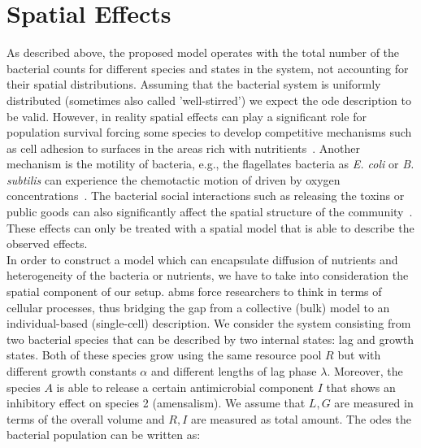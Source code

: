 \documentclass[10pt,A4paper]{article}
\numberwithin{equation}{section}
\begin{document}
\section{Spatial Effects}
As described above, the proposed model operates with the total number of the bacterial counts for
different species and states in the system, not accounting for their spatial distributions.
Assuming that the bacterial system is uniformly distributed (sometimes also called 'well-stirred')
we expect the \ac{ode} description to be valid.
However, in reality spatial effects can play a significant role for population survival forcing some
species to develop competitive mechanisms such as cell adhesion to surfaces in the areas rich with
nutritients~\cite{htuson_bacteriasurface_2013}.
Another mechanism is the motility of bacteria, e.g., the flagellates bacteria as \textit{E. coli} or
\textit{B. subtilis} can experience the chemotactic motion of driven by oxygen
concentrations~\cite{decoene_microscopic_2011}.
The bacterial social interactions such as releasing the toxins or public goods can also
significantly affect the spatial structure of the community~\cite{blanchard_bacterial_2015}.
These effects can only be treated with a spatial model that is able to describe the observed
effects.\\
In order to construct a model which can encapsulate diffusion of nutrients and heterogeneity of
the bacteria or nutrients, we have to take into consideration the spatial component of our setup.
\acp{abm} force researchers to think in terms of cellular processes, thus bridging the gap from a
collective (bulk) model to an individual-based (single-cell) description.
We consider the system consisting from two bacterial species that can be described by two internal
states: lag and growth states.
Both of these species grow using the same resource pool $R$ but with different growth constants
$\alpha$ and different lengths of lag phase $\lambda$.
Moreover, the species $A$ is able to release a certain antimicrobial component $I$ that shows an
inhibitory effect on species 2 (amensalism).
We assume that $L,G$ are measured in terms of the overall volume and $R,I$ are measured as total
amount.
The \acp{ode} the bacterial population can be written as:
%
%
\end{document}
